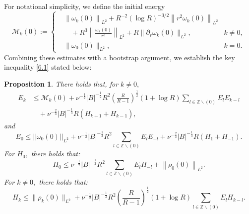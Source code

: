 \documentclass[final, 12pt,reqno]{amsart}
\newtheorem{proposition}[theorem]{\bf Proposition}
\numberwithin{equation}{section}
\begin{document}
For notational simplicity, we define the initial energy
\begin{equation}
        \mathcal{M}_k(0):=  \left\{
        \begin{aligned}
 & \left\|\omega_k(0)\right\|_{L^2}+R^{-2}(\log R)^{-3/2}\left\|r^2 \omega_k(0)\right\|_{L^2}\\
 &\quad+R^3\left\|\frac{\omega_k(0)}{r^3}\right\|_{L^2}+R\|\partial_r\omega_k(0)\|_{L^2},&k\neq 0,\\
  &\|\omega_0(0)\|_{L^2},&k=0.
 \end{aligned}
        \right.
    \end{equation}
Combining these estimates with a bootstrap argument, we establish the key inequality \eqref{6.1} stated below:
\begin{proposition}\label{pro6.1}
    There holds that, for $k\neq 0,$
    \begin{equation}\label{6.5}
 \begin{aligned}
     E_k&\leq \mathcal{M}_k(0)+\nu^{-\frac{1}{2}}|B|^{-\frac{1}{2}}R^2\left(\frac{R}{R-1}\right)^{\frac{1}{2}}(1+\log R)\sum_{l \in \mathbb{Z} \backslash(0)}E_lE_{k-l}\\
  &\quad+\nu^{-\frac{2}{3}}|B|^{-\frac{1}{3}}R(H_{k+1}+H_{k-1}),
  \end{aligned}
    \end{equation}
    and
    \begin{equation}\label{6.6}
        E_0\leq ||\omega_0(0)||_{L^2}+\nu^{-\frac{1}{2}}|B|^{-\frac{1}{2}}R^2\sum_{l \in \mathbb{Z} \backslash(0)}E_lE_{-l}+\nu^{-\frac{2}{3}}|B|^{-\frac{1}{3}}R(H_{1}+H_{-1}).
    \end{equation}
    For $H_0,$ there holds that:
    \begin{equation}\label{6.7}
 H_0\leq \nu^{-\frac{1}{2}}|B|^{-\frac{1}{2}}R^2\sum_{l \in \mathbb{Z} \backslash(0)}E_lH_{-l}+\left\| \rho_0(0)\right\|_{L^2}.
    \end{equation}
    For $k\neq 0,$ there holds that:
\begin{equation}\label{6.8}
    H_k\leq \|\rho_k(0)\|_{L^2}+\nu^{-\frac{1}{2}}|B|^{-\frac{1}{2}}R^2\left(\frac{R}{R-1}\right)^{\frac{1}{2}}(1+\log R)\sum_{l \in \mathbb{Z} \backslash(0)}E_lH_{k-l}.
\end{equation}
\end{proposition}
\end{document}

